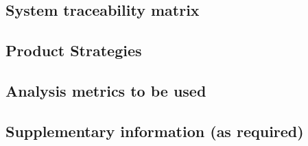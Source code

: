 \documentclass{article}
\begin{document}
\subsection{System traceability matrix}

\subsection{Product Strategies}

\subsection{Analysis metrics to be used}

\subsection{Supplementary information (as required)}
\end{document}
